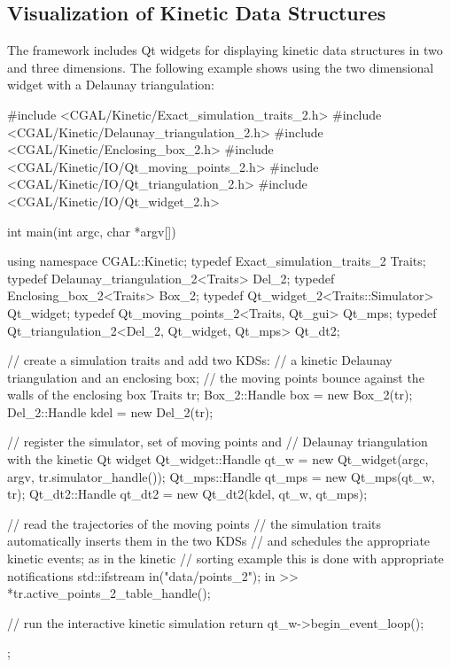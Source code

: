 

\subsection{Visualization of Kinetic Data Structures\label{sec:kds_delaunay_2_example}}


The framework includes Qt widgets for displaying kinetic data
structures in two and three dimensions. The following example shows
using the two dimensional widget with a Delaunay triangulation:

\begin{ccExampleCode}
#include <CGAL/Kinetic/Exact_simulation_traits_2.h>
#include <CGAL/Kinetic/Delaunay_triangulation_2.h>
#include <CGAL/Kinetic/Enclosing_box_2.h>
#include <CGAL/Kinetic/IO/Qt_moving_points_2.h>
#include <CGAL/Kinetic/IO/Qt_triangulation_2.h>
#include <CGAL/Kinetic/IO/Qt_widget_2.h>

int main(int argc, char *argv[]) {
    using namespace CGAL::Kinetic;
    typedef Exact_simulation_traits_2 Traits;
    typedef Delaunay_triangulation_2<Traits> Del_2;
    typedef Enclosing_box_2<Traits> Box_2;
    typedef Qt_widget_2<Traits::Simulator> Qt_widget;
    typedef Qt_moving_points_2<Traits, Qt_gui> Qt_mps;
    typedef Qt_triangulation_2<Del_2, Qt_widget, Qt_mps> Qt_dt2;
    
    // create a simulation traits and add two KDSs:
    // a kinetic Delaunay triangulation and an enclosing box;
    // the moving points bounce against the walls of the enclosing box
    Traits tr;
    Box_2::Handle box = new Box_2(tr);
    Del_2::Handle kdel = new Del_2(tr);

    // register the simulator, set of moving points and
    // Delaunay triangulation with the kinetic Qt widget
    Qt_widget::Handle qt_w = new Qt_widget(argc, argv, tr.simulator_handle());
    Qt_mps::Handle qt_mps = new Qt_mps(qt_w, tr);
    Qt_dt2::Handle qt_dt2 = new Qt_dt2(kdel, qt_w, qt_mps);

    // read the trajectories of the moving points
    //  the simulation traits automatically inserts them in the two KDSs
    // and schedules the appropriate kinetic events; as in the kinetic
    // sorting example this is done with appropriate notifications
    std::ifstream in("data/points_2");    
    in  >> *tr.active_points_2_table_handle();

    // run the interactive kinetic simulation
    return qt_w->begin_event_loop();
};
\end{ccExampleCode}

